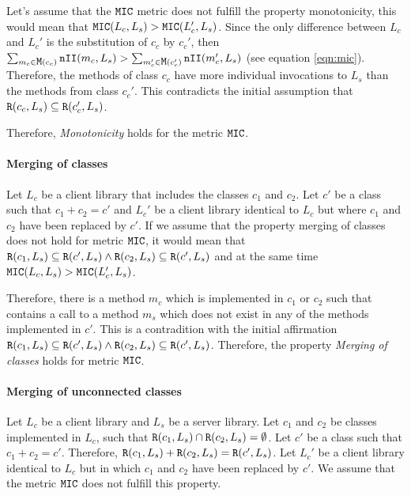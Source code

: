 Let's assume that the $\verb|MIC|$ metric does not fulfill the property monotonicity, this would mean that $\verb|MIC|(L_c, L_s) > \verb|MIC|(L_c', L_s)$. Since the only difference between $L_c$ and $L_c'$ is the substitution of $c_c$ by $c_c'$, then $\sum_{m_c \in \verb|M|(c_c)} \verb|nII|(m_c, L_s) > \sum_{m_c' \in \verb|M|(c_c')} \verb|nII|(m_c', L_s)$ (see equation \ref{eqn:mic}). Therefore, the methods of class $c_c$ have more individual invocations to $L_s$ than the methods from class $c_c'$. This contradicts the initial assumption that $\verb|R|(c_c, L_s) \subseteq \verb|R|(c_c', L_s)$.

Therefore, \textit{Monotonicity} holds for the metric $\verb|MIC|$.

\paragraph{Merging of classes}
Let $L_c$ be a client library that includes the classes $c_1$ and $c_2$. Let $c'$ be a class such that $c_1 + c_2 = c'$ and $L_c'$ be a client library identical to $L_c$ but where $c_1$ and $c_2$ have been replaced by $c'$. If we assume that the property merging of classes does not hold for metric $\verb|MIC|$, it would mean that $\verb|R|(c_1, L_s) \subseteq \verb|R|(c', L_s) \land \verb|R|(c_2, L_s) \subseteq \verb|R|(c', L_s)$ and at the same time $\verb|MIC|(L_c, L_s) > \verb|MIC|(L_c', L_s)$.

Therefore, there is a method $m_c$ which is implemented in $c_1$ or $c_2$ such that contains a call to a method $m_s$ which does not exist in any of the methods implemented in $c'$. This is a contradition with the initial affirmation $\verb|R|(c_1, L_s) \subseteq \verb|R|(c', L_s) \land \verb|R|(c_2, L_s) \subseteq \verb|R|(c', L_s)$. Therefore, the property \textit{Merging of classes} holds for metric $\verb|MIC|$.

\paragraph{Merging of unconnected classes}
Let $L_c$ be a client library and $L_s$ be a server library. Let $c_1$ and $c_2$ be classes implemented in $L_c$, such that $\verb|R|(c_1, L_s) \cap \verb|R|(c_2, L_s) = \emptyset$. Let $c'$ be a class such that $c_1 + c_2 = c'$. Therefore, $\verb|R|(c_1, L_s) + \verb|R|(c_2, L_s) = \verb|R|(c', L_s)$. Let $L_c'$ be a client library identical to $L_c$ but in which $c_1$ and $c_2$ have been replaced by $c'$. We assume that the metric $\verb|MIC|$ does not fulfill this property.

